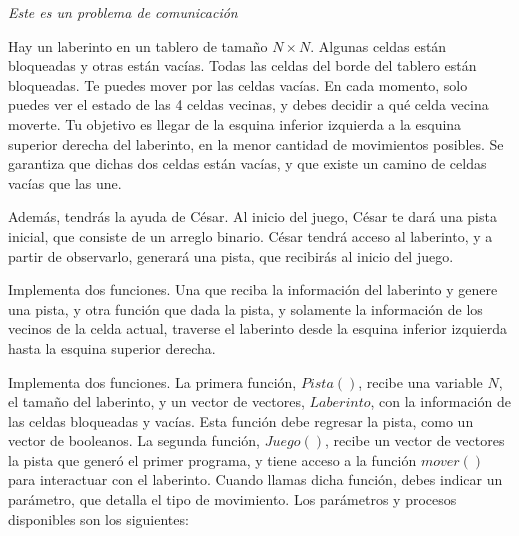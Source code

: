 \documentclass[12pt]{scrartcl}
\begin{document}
    
    {\itshape Este es un problema de comunicación}
    
    \vspace{10pt}

    Hay un laberinto en un tablero de tamaño $N\times N$. Algunas celdas están bloqueadas y otras están vacías. Todas las celdas del borde del tablero están bloqueadas. Te puedes mover por las celdas vacías. En cada momento, solo puedes ver el estado de las 4 celdas vecinas, y debes decidir a qué celda vecina moverte. Tu objetivo es llegar de la esquina inferior izquierda a la esquina superior derecha del laberinto, en la menor cantidad de movimientos posibles. Se garantiza que dichas dos celdas están vacías, y que existe un camino de celdas vacías que las une. 

    Además, tendrás la ayuda de César. Al inicio del juego, César te dará una pista inicial, que consiste de un arreglo binario. César tendrá acceso al laberinto, y a partir de observarlo, generará una pista, que recibirás al inicio del juego. 

    
    Implementa dos funciones. Una que reciba la información del laberinto y genere una pista, y otra función que dada la pista, y solamente la información de los vecinos de la celda actual, traverse el laberinto desde la esquina inferior izquierda hasta la esquina superior derecha.


    Implementa dos funciones. La primera función, $Pista()$, recibe una variable $N$, el tamaño del laberinto, y un vector de vectores, $Laberinto$, con la información de las celdas bloqueadas y vacías. Esta función debe regresar la pista, como un vector de booleanos. La segunda función, $Juego()$, recibe un vector de vectores la pista que generó el primer programa, y tiene acceso a la función $mover()$ para interactuar con el laberinto. Cuando llamas dicha función, debes indicar un parámetro, que detalla el tipo de movimiento. Los parámetros y procesos disponibles son los siguientes:
\end{document}
